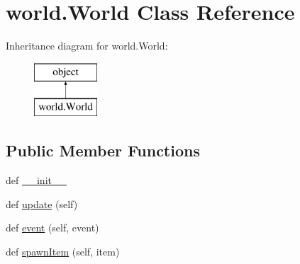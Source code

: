 \hypertarget{classworld_1_1_world}{}\section{world.\+World Class Reference}
\label{classworld_1_1_world}
Inheritance diagram for world.\+World\+:\begin{figure}[H]
\begin{center}
\leavevmode
\includegraphics[height=2.000000cm]{classworld_1_1_world}
\end{center}
\end{figure}
\subsection*{Public Member Functions}
\begin{DoxyCompactItemize}
\item 
def \hyperlink{classworld_1_1_world_a4351253668240be9d3a0d5bc2f1aa18f}{\+\_\+\+\_\+init\+\_\+\+\_\+}
\item 
def \hyperlink{classworld_1_1_world_aa29a26c0428a86089df77ad1969f2bea}{update} (self)
\item 
def \hyperlink{classworld_1_1_world_a08d655c1879ed557721de4e83dcff351}{event} (self, event)
\item 
def \hyperlink{classworld_1_1_world_adcfacaddb2803daf47361ce61c4cb6ee}{spawn\+Item} (self, item)
\end{DoxyCompactItemize}
